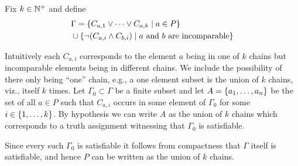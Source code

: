 \documentclass[10pt]{article}
\begin{document}
\begin{enumerate}
Fix $k \in \mathbb{N}^+$ and define
\begin{align*}
&\Gamma = \left\{ C_{a,1} \lor \cdots \lor C_{a, k} \mid a \in P \right\} \\
&\cup \left\{ \neg(C_{a,i} \land C_{b,i}) \mid \mbox{$a$ and $b$ are incomparable} \right\}
\end{align*}

Intuitively each $C_{a,i}$ corresponds to the element $a$ being in one of $k$ chains but incomparable elements being in different chains.  We include the possibility of there only being ``one'' chain, e.g., a one element subset is the union of $k$ chains, viz., itself $k$ times.  Let $\Gamma_0 \subset \Gamma$ be a finite subset and let $A = \left\{ a_1, \ldots, a_n \right\}$ be the set of all $a \in P$ such that $C_{a,i}$ occurs in some element of $\Gamma_0$ for some $i \in \left\{ 1, \ldots, k \right\}$.  By hypothesis we can write $A$ as the union of $k$ chains which corresponds to a truth assignment witnessing that $\Gamma_0$ is satisfiable.

Since every such $\Gamma_0$ is satisfiable it follows from compactness that $\Gamma$ itself is satisfiable, and hence $P$ can be written as the union of $k$ chains.
\end{enumerate}
\end{document}
